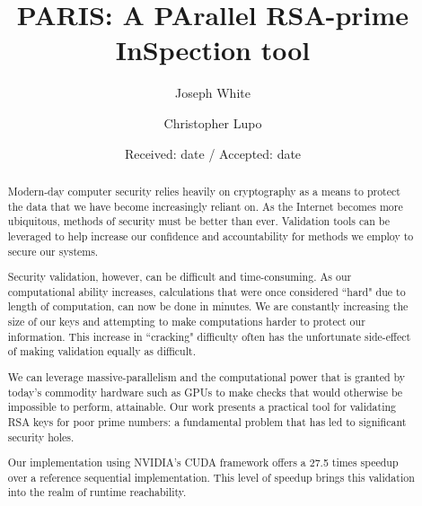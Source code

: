 \documentclass[smallextended]{svjour3}       %
\begin{document}
\title{PARIS: A PArallel RSA-prime InSpection tool%
}


\author{Joseph White\and
        Christopher Lupo%
}



\date{Received: date / Accepted: date}


\maketitle

\begin{abstract}
Modern-day computer security relies heavily on cryptography as a means to
protect the data that we have become increasingly reliant on. As the Internet
becomes more ubiquitous, methods of security must be better than ever.
Validation tools can be leveraged to help increase our confidence and
accountability for methods we employ to secure our systems. 

Security validation, however, can be difficult and time-consuming. As our
computational ability increases, calculations that were once considered ``hard"
due to length of computation, can now be done in minutes. We are constantly
increasing the size of our keys and attempting to make computations harder to
protect our information. This increase in ``cracking" difficulty often has the
unfortunate side-effect of making validation equally as difficult.

We can leverage massive-parallelism and the computational power that is granted
by today's commodity hardware such as GPUs to make checks that would
otherwise be impossible to perform, attainable. Our work presents a practical
tool for validating RSA keys for poor prime numbers: a fundamental problem
that has led to significant security holes.

Our implementation using NVIDIA's CUDA framework offers a 27.5 times speedup
over a reference sequential implementation. This level of speedup brings this
validation into the realm of runtime reachability.

\end{abstract}
\end{document}
